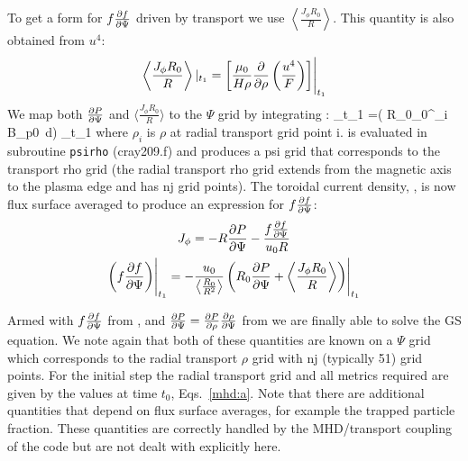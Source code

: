 To get a form for $f\frac{\partial{ f}}{\partial{ \Psi}} $ driven by transport we use
$\left\langle\frac{J_\phi R_0}{R}\right\rangle$. This quantity is also obtained from $u^4$:
\begin{subequations}\label{mhd:l}
 \begin{gather}
  \left\langle\frac{J_\phi R_0}{R}\right\rangle\vert_{t_1}
  =  \left [ \frac{\mu_0}{H\rho} \frac{\partial}{\partial \rho}\left(\frac{u^4}{F}\right) \right ]
  \Biggr \vert_{t_1}  \label{mhd:l1}
 \end{gather}
\end{subequations}
We map  both  $\frac{\partial{ P}}{\partial{ \Psi}}$ and $\langle\frac{J_\phi R_0}{R}\rangle$ to the
$\Psi$ grid by integrating :
\beq
  \vert_{t_1} =\left (
 R_0\int_0^{\rho_i} B_{p0}\, d\rho\right ) \Biggr \vert_{t_1} \label{mhdm}
\eeq
where $\rho_i$ is $\rho $ at radial transport grid point i.  is
evaluated in subroutine \texttt{psirho} (cray209.f) and produces a psi grid that
corresponds to the transport rho grid (the radial transport rho grid extends
from the magnetic axis to the plasma edge and has nj grid points). The toroidal
current density, , is now flux surface averaged  to produce an
expression for $f\frac{\partial{ f}}{\partial{ \Psi}}$:
\begin{subequations}\label{mhd:n}
 \begin{gather}
  J_\phi= -R\frac{\partial{ P}}{\partial{ \Psi}}-\frac{f\frac{\partial{ f}}{\partial{ \Psi}}}{u_0R} \label{mhd:n1}\\
  \left (f\frac{\partial{ f}}{\partial{ \Psi}}\right )\Biggr\vert_{t_1} = 
  -\frac{u_0}{\left\langle\frac{R_0}{R^2}\right\rangle}\left(R_0\frac{\partial{ P}}{\partial{ \Psi}} 
  +\left\langle\frac{J_\phi R_0}{R}\right\rangle \right )\Biggr \vert_{t_1}
  \label{mhd:n2}
 \end{gather}
\end{subequations}

Armed with $f\frac{\partial{ f}}{\partial{ \Psi}} $ from , and 
$\frac{\partial{ P}}{\partial{ \Psi}} =\frac{\partial{ P}}{\partial{ \rho}}\frac{\partial{ \rho}}{\partial{ \Psi}} $ from  we are
finally able to solve the GS equation. We note again that both of these
quantities are known on a $\Psi$ grid which corresponds to the radial transport
$\rho $ grid with nj (typically 51) grid points. For the initial step the radial
transport grid and all metrics required are given by the values at time $t_0$,
Eqs.~\eqref{mhd:a}. Note that there are additional quantities that depend on
flux surface averages, for example the trapped particle fraction. These
quantities are correctly handled by the MHD/transport coupling of the code but
are not dealt with explicitly here.

